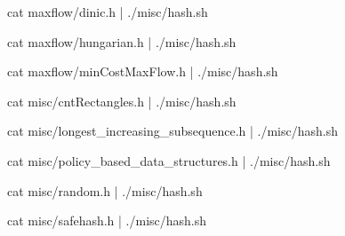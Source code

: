 \documentclass[12pt,letterpaper,twocolumn,landscape]{article}
\begin{document}

cat maxflow/dinic.h | ./misc/hash.sh
\END

cat maxflow/hungarian.h | ./misc/hash.sh
\END

cat maxflow/minCostMaxFlow.h | ./misc/hash.sh
\END



cat misc/cntRectangles.h | ./misc/hash.sh
\END

cat misc/longest_increasing_subsequence.h | ./misc/hash.sh
\END

cat misc/policy_based_data_structures.h | ./misc/hash.sh
\END

cat misc/random.h | ./misc/hash.sh
\END

cat misc/safehash.h | ./misc/hash.sh
\END


\pagebreak
\end{document}
